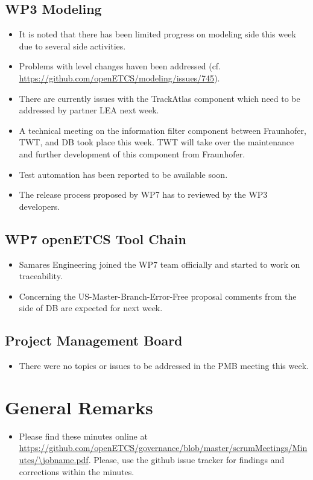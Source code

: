 \documentclass[a4paper, 11pt]{article}
\begin{document}
\subsection{WP3 Modeling}
\begin{itemize}
\item It is noted that there has been limited progress on modeling side this week due to several side activities.
\item Problems with level changes haven been addressed (cf. \url{https://github.com/openETCS/modeling/issues/745}).
\item There are currently issues with the TrackAtlas component which need to be addressed by partner LEA next week.
\item A technical meeting on the information filter component between Fraunhofer, TWT, and DB took place this week. TWT will take over the maintenance and further development of this component from Fraunhofer.
\item Test automation has been reported to be available soon.
\item The release process proposed by WP7 has to reviewed by the WP3 developers.
\end{itemize}

\subsection{WP7 openETCS Tool Chain}
\begin{itemize}
\item Samares Engineering joined the WP7 team officially and started to work on traceability.
\item Concerning the US-Master-Branch-Error-Free proposal comments from the side of DB are expected for next week.
\end{itemize}

\subsection{Project Management Board}
\begin{itemize}
\item There were no topics or issues to be addressed in the PMB meeting this week.
\end{itemize}


\section{General Remarks}

\begin{itemize}
\item Please find these minutes online at \url{https://github.com/openETCS/governance/blob/master/scrumMeetings/Minutes/\jobname.pdf}. Please, use the github issue tracker for findings and corrections within the minutes.
\end{itemize}
\end{document}
